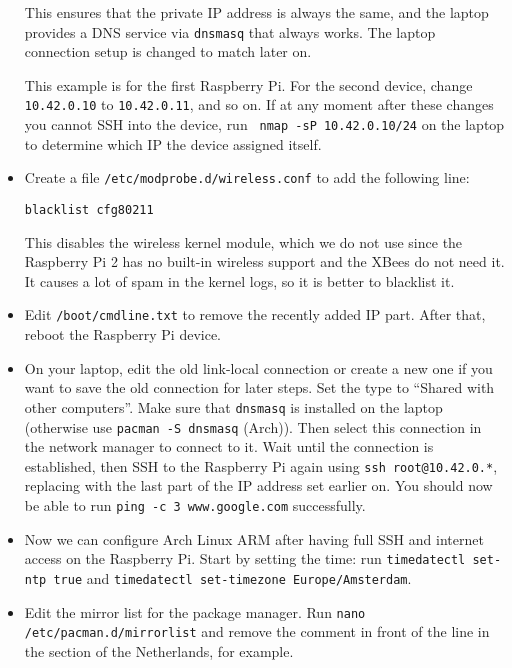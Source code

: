 \documentclass{article}
\newcommand{\arch}{{\color{red} (Arch)}}
\begin{document}
\begin{itemize}
          This ensures that the private IP address is always the same, and the 
          laptop provides a DNS service via {\tt dnsmasq} that always works. 
          The laptop connection setup is changed to match later on.

          This example is for the first Raspberry Pi. For the second device, 
          change {\tt 10.42.0.10} to {\tt 10.42.0.11}, and so on. If at any 
          moment after these changes you cannot SSH into the device, run {\tt 
          nmap -sP 10.42.0.10/24} on the laptop to determine which IP the 
          device assigned itself.
    \item Create a file {\tt /etc/modprobe.d/wireless.conf} to add the 
          following line:

          {\tt blacklist cfg80211}

          This disables the wireless kernel module, which we do not use since 
          the Raspberry Pi 2 has no built-in wireless support and the XBees do 
          not need it. It causes a lot of spam in the kernel logs, so it is 
          better to blacklist it.
    \item Edit {\tt /boot/cmdline.txt} to remove the recently added IP part.
          After that, reboot the Raspberry Pi device.
    \item On your laptop, edit the old link-local connection or create a new 
          one if you want to save the old connection for later steps. Set the 
          type to ``Shared with other computers''. Make sure that {\tt dnsmasq} 
          is installed on the laptop (otherwise use {\tt pacman -S dnsmasq} 
          \arch{}). Then select this connection in the network manager to 
          connect to it. Wait until the connection is established, then SSH to 
          the Raspberry Pi again using {\tt ssh root@10.42.0.*}, replacing 
          {\tt *} with the last part of the IP address set earlier on. You 
          should now be able to run {\tt ping -c 3 www.google.com} 
          successfully.
    \item Now we can configure Arch Linux ARM after having full SSH and 
          internet access on the Raspberry Pi. Start by setting the time: run 
          {\tt timedatectl set-ntp true} and {\tt timedatectl set-timezone 
          Europe/Amsterdam}.
    \item Edit the mirror list for the package manager. Run {\tt nano 
          /etc/pacman.d/mirrorlist} and remove the comment in front of the line 
          in the section of the Netherlands, for example.

\end{itemize}
\end{document}
